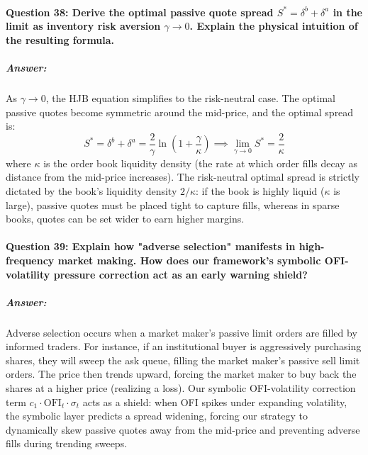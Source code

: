 \documentclass[11pt,a4paper]{article}
\begin{document}
\paragraph{Question 38: Derive the optimal passive quote spread $S^* = \delta^b + \delta^a$ in the limit as inventory risk aversion $\gamma \to 0$. Explain the physical intuition of the resulting formula.}
\subparagraph{Answer:}
As $\gamma \to 0$, the HJB equation simplifies to the risk-neutral case. The optimal passive quotes become symmetric around the mid-price, and the optimal spread is:
\begin{equation}
    S^* = \delta^b + \delta^a = \frac{2}{\gamma} \ln\left(1 + \frac{\gamma}{\kappa}\right) \implies \lim_{\gamma \to 0} S^* = \frac{2}{\kappa}
\end{equation}
where $\kappa$ is the order book liquidity density (the rate at which order fills decay as distance from the mid-price increases).
The risk-neutral optimal spread is strictly dictated by the book's liquidity density $2/\kappa$: if the book is highly liquid ($\kappa$ is large), passive quotes must be placed tight to capture fills, whereas in sparse books, quotes can be set wider to earn higher margins.

\paragraph{Question 39: Explain how "adverse selection" manifests in high-frequency market making. How does our framework's symbolic OFI-volatility pressure correction act as an early warning shield?}
\subparagraph{Answer:}
Adverse selection occurs when a market maker's passive limit orders are filled by informed traders. For instance, if an institutional buyer is aggressively purchasing shares, they will sweep the ask queue, filling the market maker's passive sell limit orders. The price then trends upward, forcing the market maker to buy back the shares at a higher price (realizing a loss).
Our symbolic OFI-volatility correction term $c_1 \cdot \text{OFI}_t \cdot \sigma_t$ acts as a shield: when OFI spikes under expanding volatility, the symbolic layer predicts a spread widening, forcing our strategy to dynamically skew passive quotes away from the mid-price and preventing adverse fills during trending sweeps.
\end{document}
